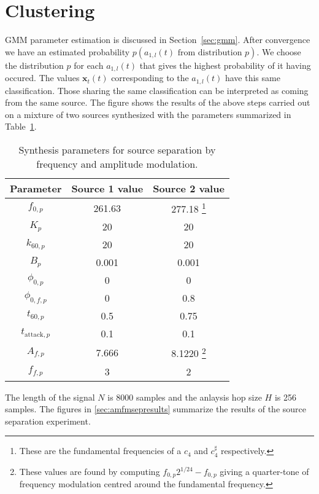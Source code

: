 \section{Clustering}
GMM parameter estimation is discussed in Section~\ref{sec:gmm}. After
convergence we have an estimated probability $p(a_{1,l}(t) \text{ from
distribution }p)$. We choose the distribution $p$ for each $a_{1,l}(t)$ that
gives the highest probability of it having occured. The values
$\mathbf{x}_{t}(t)$ corresponding to the $a_{1,l}(t)$ have this same
classification. Those sharing the same classification can be interpreted as
coming from the same source. The figure shows the results of the above steps
carried out on a mixture of two sources synthesized with the 
parameters summarized in Table~\ref{tab:synthparamamfmsep}.
\begin{table}
    \begin{center}
        \begin{tabular}{c c c }
            Parameter & Source 1 value & Source 2 value \\
            \hline
            $f_{0,p}$ & 261.63 & 277.18 \footnote{These are the fundamental
            frequencies of a $c_{4}$
            and $c_{4}^{\sharp}$ respectively.} \\
            $K_{p}$ & 20 & 20 \\
            $k_{60,p}$ & 20 & 20 \\
            $B_{p}$ & 0.001 & 0.001 \\
            $\phi_{0,p}$ & 0 & 0 \\
            $\phi_{0,f,p}$ & 0 & 0.8 \\
            $t_{60,p}$ & 0.5 & 0.75 \\
            $t_{\text{attack},p}$ & 0.1 & 0.1 \\
            $A_{f,p}$ & 7.666 & 8.1220 \footnote{These values are found by
            computing $f_{0,p}2^{1/24}-f_{0,p}$ giving a quarter-tone of
            frequency modulation centred around the fundamental frequency.} \\
            $f_{f,p}$ & 3 & 2
        \end{tabular}
    \end{center}
    \caption{Synthesis parameters for source separation by frequency and
    amplitude modulation. \label{tab:synthparamamfmsep}}
\end{table}
The length of the signal $N$ is 8000 samples and the anlaysis hop size $H$ is 256
samples. The figures in \ref{sec:amfmsepresults} summarize the results of the
source separation experiment.

